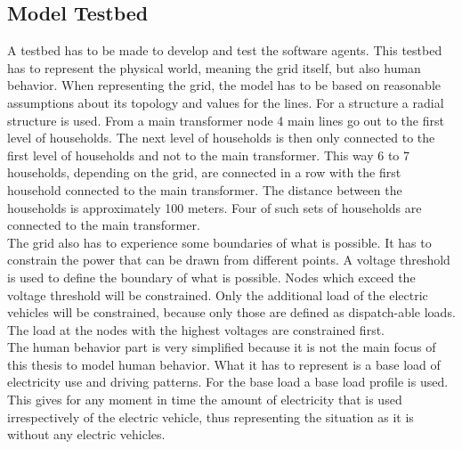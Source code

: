 \documentclass[a4paper]{article}
\begin{document}
\subsection{Model Testbed}
A testbed has to be made to develop and test the software agents. This testbed has to represent the physical world,
meaning the 
grid itself, but also human behavior. When representing the grid, the model has to be based on reasonable
assumptions 
about its topology and values for the lines. For a structure a radial structure is used. From a main transformer node 
4 main lines go out to the first level of households. The next level of households is then only connected to the 
first level of households and not to the main transformer. This way 6 to 7 households, depending on the grid, 
are connected in a row with the 
first household connected to the main transformer. The distance between the households is approximately 100 meters.
Four of such sets of households are connected to the main transformer. \\
The grid also has to experience some boundaries of what is possible. 
It has to constrain the power
that can be drawn from different points. A voltage threshold is used to define the boundary of what is possible. 
Nodes which exceed the voltage threshold will be constrained.
Only the additional load of the electric vehicles will be constrained, because 
only those are defined as dispatch-able loads. The load at the nodes with the highest voltages are constrained first.\\
The human behavior part is very simplified because it is not the main focus of this thesis to model 
human behavior. What it has to 
represent is a base load of electricity use and driving patterns. 
For the base load a base load profile is used. This gives for any moment in time the amount of electricity that is used 
irrespectively of the electric vehicle, thus representing the situation as it is without any electric vehicles. \\
\end{document}

